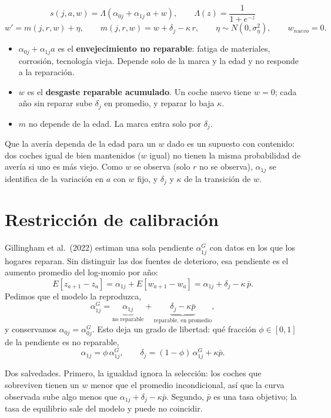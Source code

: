 \documentclass{article}
\begin{document}
$$s(j,a,w)=\Lambda\left(\alpha_{0j}+\alpha_{1j}\,a+w\right),\qquad \Lambda(z)=\frac{1}{1+e^{-z}}$$
$$w'=m(j,r,w)+\eta,\qquad m(j,r,w)=w+\delta_j-\kappa\,r,\qquad \eta\sim N(0,\sigma_\eta^2),\qquad w_{nuevo}=0 .$$

\begin{itemize}
    \item $\alpha_{0j}+\alpha_{1j}a$ es el \textbf{envejecimiento no reparable}: fatiga de materiales, corrosión, tecnología vieja. Depende solo de la marca y la edad y no responde a la reparación.
    \item $w$ es el \textbf{desgaste reparable acumulado}. Un coche nuevo tiene $w=0$; cada año sin reparar sube $\delta_j$ en promedio, y reparar lo baja $\kappa$.
    \item $m$ no depende de la edad. La marca entra solo por $\delta_j$.
\end{itemize}

Que la avería dependa de la edad para un $w$ dado es un supuesto con contenido: dos coches igual de bien mantenidos ($w$ igual) no tienen la misma probabilidad de avería si uno es más viejo. Como $w$ se observa (solo $r$ no se observa), $\alpha_{1j}$ se identifica de la variación en $a$ con $w$ fijo, y $\delta_j$ y $\kappa$ de la transición de $w$.

\section{Restricción de calibración}

Gillingham et al.\ (2022) estiman una sola pendiente $\alpha^G_{1j}$ con datos en los que los hogares reparan. Sin distinguir las dos fuentes de deterioro, esa pendiente es el aumento promedio del log-momio por año:
$$E[z_{a+1}-z_a]=\alpha_{1j}+E[w_{a+1}-w_a]=\alpha_{1j}+\delta_j-\kappa\,\bar{p}.$$
Pedimos que el modelo la reproduzca,
$$\alpha^G_{1j}=\underbrace{\alpha_{1j}}_{\text{no reparable}}+\underbrace{\delta_j-\kappa\bar{p}}_{\text{reparable, en promedio}},$$
y conservamos $\alpha_{0j}=\alpha^G_{0j}$. Esto deja un grado de libertad: qué fracción $\phi\in[0,1]$ de la pendiente es no reparable,
$$\alpha_{1j}=\phi\,\alpha^G_{1j},\qquad \delta_j=(1-\phi)\,\alpha^G_{1j}+\kappa\bar{p}.$$

Dos salvedades. Primero, la igualdad ignora la selección: los coches que sobreviven tienen un $w$ menor que el promedio incondicional, así que la curva observada sube algo menos que $\alpha_{1j}+\delta_j-\kappa\bar{p}$. Segundo, $\bar{p}$ es una tasa objetivo; la tasa de equilibrio sale del modelo y puede no coincidir.
\end{document}
